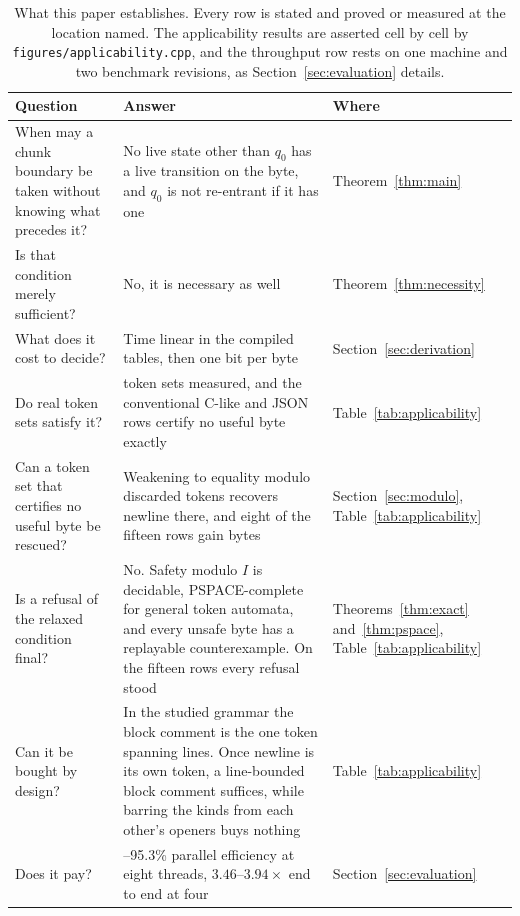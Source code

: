 \documentclass[11pt,a4paper]{article}
\theoremstyle{definition}
\theoremstyle{plain}
\newcommand{\code}[1]{\texttt{#1}}
\begin{document}
\begin{table}[!ht]
\centering
\begin{tabular}{>{\raggedright\arraybackslash}p{6.2cm}>{\raggedright\arraybackslash}p{5.1cm}
    >{\raggedright\arraybackslash}p{3.35cm}}
\toprule
Question & Answer & Where \\
\midrule
When may a chunk boundary be taken without knowing what precedes it? & No live state other than $q_0$ has a live
    transition on the byte, and $q_0$ is not re-entrant if it has one & Theorem~\ref{thm:main} \\
\addlinespace
Is that condition merely sufficient? & No, it is necessary as well & Theorem~\ref{thm:necessity} \\
\addlinespace
What does it cost to decide? & Time linear in the compiled tables, then one bit per byte & Section~\ref{sec:derivation}
    \\
\addlinespace
Do real token sets satisfy it? & 15 token sets measured, and the conventional C-like and JSON rows certify no useful
    byte exactly & Table~\ref{tab:applicability} \\
\addlinespace
Can a token set that certifies no useful byte be rescued? & Weakening to equality modulo discarded tokens recovers
    newline there, and eight of the fifteen rows gain bytes & Section~\ref{sec:modulo}, Table~\ref{tab:applicability} \\
\addlinespace
Is a refusal of the relaxed condition final? & No. Safety modulo $I$ is decidable, PSPACE-complete for general token
    automata, and every unsafe byte has a replayable counterexample. On the fifteen rows every refusal stood &
    Theorems~\ref{thm:exact} and~\ref{thm:pspace}, Table~\ref{tab:applicability} \\
\addlinespace
Can it be bought by design? & In the studied grammar the block comment is the one token spanning lines. Once newline is
    its own token, a line-bounded block comment suffices, while barring the kinds from each other's openers buys nothing
    & Table~\ref{tab:applicability} \\
\addlinespace
Does it pay? & 92.6--95.3\% parallel efficiency at eight threads, $3.46$--$3.94\times$ end to end at four &
    Section~\ref{sec:evaluation} \\
\bottomrule
\end{tabular}
\caption{What this paper establishes. Every row is stated and proved or measured at the location named. The
applicability results are asserted cell by cell by \code{figures/applicability.cpp}, and the throughput row rests on one
machine and two benchmark revisions, as Section~\ref{sec:evaluation} details.}
\label{tab:results}
\end{table}
\end{document}
